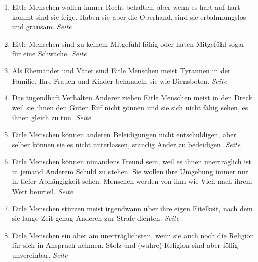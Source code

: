 \begin{enumerate}
\begin{enumerate}
 \item Eitle Menschen wollen immer Recht behalten, aber wenn es hart-auf-hart kommt sind sie feige. Haben sie aber die Oberhand, sind sie erbahmungslos und grausam.
 \dotfill \textit{Seite \pageref{ref:12_02_eitle_menschen_streit}}\\

 \item Eitle Menschen sind zu keinem Mitgefühl fähig oder haten Mitgefühl sogar für eine Schwäche.
 \dotfill \textit{Seite \pageref{ref:12_02_eitle_menschen_mitgefuehl}}\\
 
 \item Als Ehemänder und Väter sind Eitle Menschen meist Tyrannen in der Familie. Ihre Frauen und Kinder behandeln sie wie Diensboten.
 \dotfill \textit{Seite \pageref{ref:12_03_eitle_menschen_ehe}}\\
 
 \item Das tugendhaft Verhalten Anderer ziehen Eitle Menschen meist in den Dreck weil sie ihnen den Guten Ruf nicht gönnen und sie sich nicht fähig sehen, es ihnen gleich zu tun.
 \dotfill \textit{Seite \pageref{ref:12_04_eitle_menschen_tugent}}\\
 
 \item Eitle Menschen können anderen Beleidigungen nicht entschuldigen, aber selber können sie es nicht unterlassen, ständig Ander zu bedeidigen.
 \dotfill \textit{Seite \pageref{ref:12_04_eitle_menschen_beleidigung}}\\
 
 \item Eitle Menschen können nimandens Freund sein, weil es ihnen unerträglich ist in jemand Anderem Schuld zu stehen. Sie wollen ihre Umgebung immer nur in tiefer Abhängigkeit sehen. Menschen werden von ihm wie Vieh nach ihrem Wert beurteil.
 \dotfill \textit{Seite \pageref{ref:12_05_eitle_menschen_freundschaft}}\\
 
 \item Eitle Menschen stürzen meist irgendwann über ihre eigen Eitelkeit, nach dem sie lange Zeit genug Anderen zur Strafe dienten. 
 \dotfill \textit{Seite \pageref{ref:12_06_eitle_menschen_sturz}}\\
 
 \item Eitle Menschen sin aber am unerträglichsten, wenn sie auch noch die Religion für sich in Anspruch nehmen. Stolz und (wahre) Religion sind aber föllig unvereinbar.
 \dotfill \textit{Seite \pageref{ref:12_07_eitle_menschen_religion}}\\
 

\end{enumerate}
\end{enumerate}
